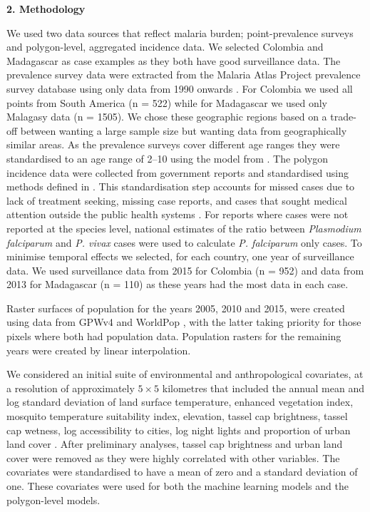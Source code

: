 \documentclass[11pt]{article}
\begin{document}
{\bf 2. Methodology}

We used two data sources that reflect malaria burden; point-prevalence surveys and polygon-level, aggregated incidence data. 
We selected Colombia and Madagascar as case examples as they both have good surveillance data.
The prevalence survey data were extracted from the Malaria Atlas Project prevalence survey database using only data from 1990 onwards \citep{bhatt2015effect, guerra2007assembling}.  %
For Colombia we used all points from South America (n = 522) while for Madagascar we used only Malagasy data (n = 1505).
We chose these geographic regions based on a trade-off between wanting a large sample size but wanting data from geographically similar areas.
As the prevalence surveys cover different age ranges they were standardised to an age range of 2--10 using the model from \citep{smith2007standardizing}.
The polygon incidence data were collected from government reports and standardised using methods defined in \cite{cibulskis2011worldwide}.
This standardisation step accounts for missed cases due to lack of treatment seeking, missing case reports, and cases that sought medical attention outside the public health systems \citep{battle2016treatment}.
For reports where cases were not reported at the species level, national estimates of the ratio between \emph{Plasmodium falciparum} and \emph{P. vivax} cases were used to calculate \emph{P. falciparum} only cases. 
To minimise temporal effects we selected, for each country, one year of surveillance data. 
We used surveillance data from 2015 for Colombia (n = 952) and data from 2013 for Madagascar (n = 110) as these years had the most data in each case.

Raster surfaces of population for the years 2005, 2010 and 2015, were created using data from GPWv4 \citep{gpw4} and WorldPop \citep{tatem2017worldpop}, with the latter taking priority for those pixels where both had population data. 
Population rasters for the remaining years were created by linear interpolation. 

We considered an initial suite of environmental and anthropological covariates, at a resolution of approximately $5 \times 5$ kilometres that included the annual mean and log standard deviation of land surface temperature, enhanced vegetation index, mosquito temperature suitability index, elevation, tassel cap brightness, tassel cap wetness, log accessibility to cities, log night lights and proportion of urban land cover \cite{weiss2015re}. 
After preliminary analyses, tassel cap brightness and urban land cover were removed as they were highly correlated with other variables. 
The covariates were standardised to have a mean of zero and a standard deviation of one. 
These covariates were used for both the machine learning models and the polygon-level models.
\end{document}
